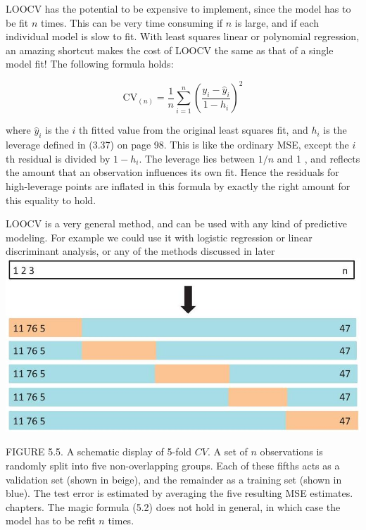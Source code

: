 \documentclass[10pt]{article}
\begin{document}
LOOCV has the potential to be expensive to implement, since the model has to be fit $n$ times. This can be very time consuming if $n$ is large, and if each individual model is slow to fit. With least squares linear or polynomial regression, an amazing shortcut makes the cost of LOOCV the same as that of a single model fit! The following formula holds:


\begin{equation*}
\mathrm{CV}_{(n)}=\frac{1}{n} \sum_{i=1}^{n}\left(\frac{y_{i}-\hat{y}_{i}}{1-h_{i}}\right)^{2} \tag{5.2}
\end{equation*}


where $\hat{y}_{i}$ is the $i$ th fitted value from the original least squares fit, and $h_{i}$ is the leverage defined in (3.37) on page 98. This is like the ordinary MSE, except the $i$ th residual is divided by $1-h_{i}$. The leverage lies between $1 / n$ and 1 , and reflects the amount that an observation influences its own fit. Hence the residuals for high-leverage points are inflated in this formula by exactly the right amount for this equality to hold.

LOOCV is a very general method, and can be used with any kind of predictive modeling. For example we could use it with logistic regression or linear discriminant analysis, or any of the methods discussed in later\\
\includegraphics[max width=\textwidth, center]{2025_05_05_efe77898333945044de4g-196}

FIGURE 5.5. A schematic display of 5-fold $C V$. A set of $n$ observations is randomly split into five non-overlapping groups. Each of these fifths acts as a validation set (shown in beige), and the remainder as a training set (shown in blue). The test error is estimated by averaging the five resulting MSE estimates.\\
chapters. The magic formula (5.2) does not hold in general, in which case the model has to be refit $n$ times.
\end{document}
